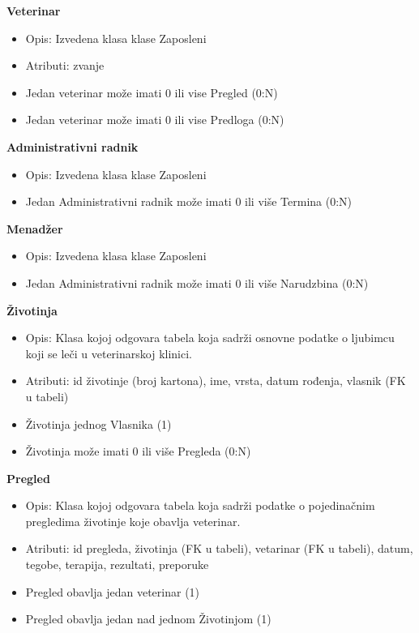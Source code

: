 \indent \textbf{Veterinar}
\begin{itemize}
    \item Opis: Izvedena klasa klase Zaposleni
    \item Atributi: zvanje
    \item Jedan veterinar može imati 0 ili vise Pregled (0:N)
    \item Jedan veterinar može imati 0 ili vise Predloga (0:N)
\end{itemize}

\indent \textbf{Administrativni radnik}
\begin{itemize}
    \item Opis: Izvedena klasa klase Zaposleni
    \item Jedan Administrativni radnik može imati 0 ili više Termina (0:N)
\end{itemize}

\indent \textbf{Menadžer}
\begin{itemize}
    \item Opis: Izvedena klasa klase Zaposleni 
    \item Jedan Administrativni radnik može imati 0 ili više Narudzbina (0:N)
\end{itemize}

\indent\textbf{Životinja}
\begin{itemize}
    \item Opis: Klasa kojoj odgovara tabela koja sadrži osnovne podatke o ljubimcu koji se leči u veterinarskoj klinici.
    \item Atributi: id životinje (broj kartona), ime, vrsta, datum rođenja, vlasnik (FK u tabeli)
    \item Životinja jednog Vlasnika (1)
    \item Životinja može imati 0 ili više Pregleda (0:N)
\end{itemize}

\indent\textbf{Pregled}
\begin{itemize}
    \item Opis: Klasa kojoj odgovara tabela koja sadrži podatke o pojedinačnim pregledima životinje koje obavlja veterinar.
    \item Atributi: id pregleda, životinja (FK u tabeli), vetarinar (FK u tabeli), datum, tegobe, terapija, rezultati, preporuke
    \item Pregled obavlja jedan veterinar (1)
    \item Pregled obavlja jedan nad jednom Životinjom (1)
\end{itemize}

